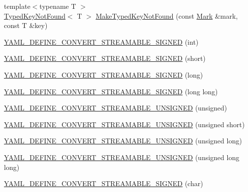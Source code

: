 \begin{DoxyCompactItemize}
\item 
{\footnotesize template$<$typename T $>$ }\\\mbox{\hyperlink{class_y_a_m_l_1_1_typed_key_not_found}{Typed\+Key\+Not\+Found}}$<$ T $>$ \mbox{\hyperlink{namespace_y_a_m_l_a54110ceefebc1c5889f1bc4be42c5cd6}{Make\+Typed\+Key\+Not\+Found}} (const \mbox{\hyperlink{struct_y_a_m_l_1_1_mark}{Mark}} \&mark, const T \&key)
\item 
\mbox{\hyperlink{namespace_y_a_m_l_a2107fc2246ece5fe031db8f36cb7c292}{Y\+A\+M\+L\+\_\+\+D\+E\+F\+I\+N\+E\+\_\+\+C\+O\+N\+V\+E\+R\+T\+\_\+\+S\+T\+R\+E\+A\+M\+A\+B\+L\+E\+\_\+\+S\+I\+G\+N\+ED}} (int)
\item 
\mbox{\hyperlink{namespace_y_a_m_l_a0e73e714546f78997780dac5eb2c0798}{Y\+A\+M\+L\+\_\+\+D\+E\+F\+I\+N\+E\+\_\+\+C\+O\+N\+V\+E\+R\+T\+\_\+\+S\+T\+R\+E\+A\+M\+A\+B\+L\+E\+\_\+\+S\+I\+G\+N\+ED}} (short)
\item 
\mbox{\hyperlink{namespace_y_a_m_l_af57faf99be6cc3fd56f519a12132666b}{Y\+A\+M\+L\+\_\+\+D\+E\+F\+I\+N\+E\+\_\+\+C\+O\+N\+V\+E\+R\+T\+\_\+\+S\+T\+R\+E\+A\+M\+A\+B\+L\+E\+\_\+\+S\+I\+G\+N\+ED}} (long)
\item 
\mbox{\hyperlink{namespace_y_a_m_l_a746a6583f314d0e9ded6777e58bd78cc}{Y\+A\+M\+L\+\_\+\+D\+E\+F\+I\+N\+E\+\_\+\+C\+O\+N\+V\+E\+R\+T\+\_\+\+S\+T\+R\+E\+A\+M\+A\+B\+L\+E\+\_\+\+S\+I\+G\+N\+ED}} (long long)
\item 
\mbox{\hyperlink{namespace_y_a_m_l_a7f1e377d3aaaac18b78afe3ae447eddc}{Y\+A\+M\+L\+\_\+\+D\+E\+F\+I\+N\+E\+\_\+\+C\+O\+N\+V\+E\+R\+T\+\_\+\+S\+T\+R\+E\+A\+M\+A\+B\+L\+E\+\_\+\+U\+N\+S\+I\+G\+N\+ED}} (unsigned)
\item 
\mbox{\hyperlink{namespace_y_a_m_l_afdcac0d3e390bcaa980178fee42ad214}{Y\+A\+M\+L\+\_\+\+D\+E\+F\+I\+N\+E\+\_\+\+C\+O\+N\+V\+E\+R\+T\+\_\+\+S\+T\+R\+E\+A\+M\+A\+B\+L\+E\+\_\+\+U\+N\+S\+I\+G\+N\+ED}} (unsigned short)
\item 
\mbox{\hyperlink{namespace_y_a_m_l_a50a4d429ce5f8ad4a2b72fdc73e69297}{Y\+A\+M\+L\+\_\+\+D\+E\+F\+I\+N\+E\+\_\+\+C\+O\+N\+V\+E\+R\+T\+\_\+\+S\+T\+R\+E\+A\+M\+A\+B\+L\+E\+\_\+\+U\+N\+S\+I\+G\+N\+ED}} (unsigned long)
\item 
\mbox{\hyperlink{namespace_y_a_m_l_aa79b3484e4ada6e6b59bd7a20994fea8}{Y\+A\+M\+L\+\_\+\+D\+E\+F\+I\+N\+E\+\_\+\+C\+O\+N\+V\+E\+R\+T\+\_\+\+S\+T\+R\+E\+A\+M\+A\+B\+L\+E\+\_\+\+U\+N\+S\+I\+G\+N\+ED}} (unsigned long long)
\item 
\mbox{\hyperlink{namespace_y_a_m_l_a61d33d69e34277e205cc9a2483f5e156}{Y\+A\+M\+L\+\_\+\+D\+E\+F\+I\+N\+E\+\_\+\+C\+O\+N\+V\+E\+R\+T\+\_\+\+S\+T\+R\+E\+A\+M\+A\+B\+L\+E\+\_\+\+S\+I\+G\+N\+ED}} (char)

\end{DoxyCompactItemize}
